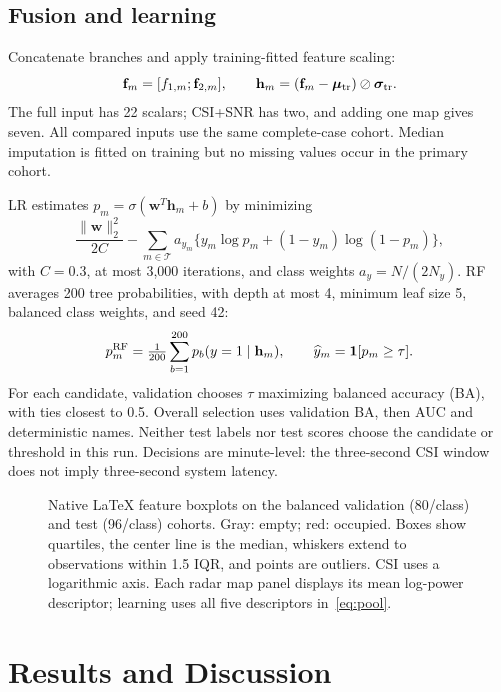 \documentclass[conference,10pt,letterpaper]{IEEEtran}
\begin{document}
\subsection{Fusion and learning}
Concatenate branches and apply training-fitted feature scaling:
\begin{equation}
\mathbf f_m=[f_{1,m};\mathbf f_{2,m}],\qquad
\mathbf h_m=(\mathbf f_m-\bm\mu_{\rm tr})\oslash\bm\sigma_{\rm tr}.\label{eq:fusion}
\end{equation}
The full input has 22 scalars; CSI+SNR has two, and adding one map gives seven. All compared inputs use the same complete-case cohort. Median imputation is fitted on training but no missing values occur in the primary cohort.

LR estimates $p_m=\sigma(\mathbf w^T\mathbf h_m+b)$ by minimizing
\begin{equation}
\frac{\|\mathbf w\|_2^2}{2C}-\sum_{m\in\mathcal T}a_{y_m}
\{y_m\log p_m+(1-y_m)\log(1-p_m)\},
\end{equation}
with $C=0.3$, at most 3,000 iterations, and class weights $a_y=N/(2N_y)$. RF averages 200 tree probabilities, with depth at most 4, minimum leaf size 5, balanced class weights, and seed 42:
\begin{equation}
p_m^{\rm RF}=\tfrac1{200}\sum_{b=1}^{200}p_b(y=1\mid\mathbf h_m),\qquad
\widehat y_m=\mathbf{1}[p_m\geq\tau].\label{eq:decision}
\end{equation}
For each candidate, validation chooses $\tau$ maximizing balanced accuracy (BA), with ties closest to 0.5. Overall selection uses validation BA, then AUC and deterministic names. Neither test labels nor test scores choose the candidate or threshold in this run. Decisions are minute-level: the three-second CSI window does not imply three-second system latency.

\begin{figure}[t]
\centering
\caption{Native LaTeX feature boxplots on the balanced validation (80/class) and test (96/class) cohorts. Gray: empty; red: occupied. Boxes show quartiles, the center line is the median, whiskers extend to observations within 1.5 IQR, and points are outliers. CSI uses a logarithmic axis. Each radar map panel displays its mean log-power descriptor; learning uses all five descriptors in~\eqref{eq:pool}.}
\label{fig:boxes}
\end{figure}

\section{Results and Discussion}
\end{document}
